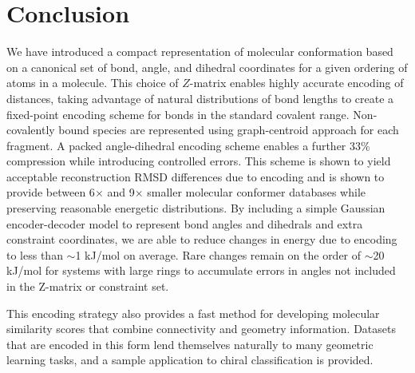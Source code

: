 \documentclass[%
 preprint,
superscriptaddress,
 amsmath,amssymb,
 aip,
 jcp,
]{revtex4-2}
\begin{document}

\section{Conclusion}

We have introduced a compact representation of molecular conformation based on a canonical set of bond, angle, and dihedral coordinates for a given ordering of atoms in a molecule.
This choice of $Z$-matrix enables highly accurate encoding of distances, taking advantage of natural distributions of bond lengths to create a fixed-point encoding scheme for bonds in the standard covalent range.
Non-covalently bound species are represented using graph-centroid approach for each fragment.
A packed angle-dihedral encoding scheme enables a further 33\% compression while introducing controlled errors.
This scheme is shown to yield acceptable reconstruction RMSD differences due to encoding and is shown to provide between 6$\times$ and 9$\times$ smaller molecular conformer databases while preserving reasonable energetic distributions.
By including a simple Gaussian encoder-decoder model to represent bond angles and dihedrals and extra constraint coordinates, we are able to reduce changes in energy due to encoding to less than $\sim$1 kJ/mol on average.
Rare changes remain on the order of $\sim$20 kJ/mol for systems with large rings to accumulate errors in angles not included in the Z-matrix or constraint set.

This encoding strategy also provides a fast method for developing molecular similarity scores that combine connectivity and geometry information.
Datasets that are encoded in this form lend themselves naturally to many geometric learning tasks, and a sample application to chiral classification is provided.
\end{document}
